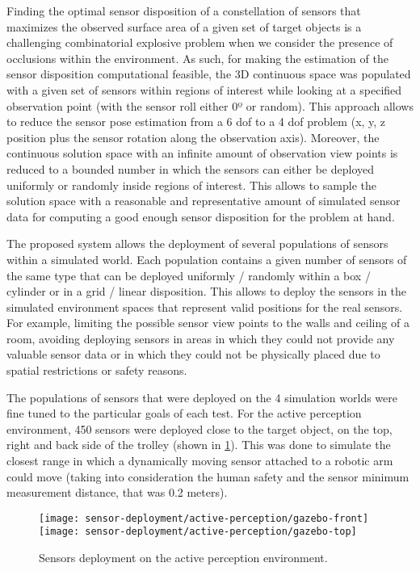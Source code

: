 Finding the optimal sensor disposition of a constellation of sensors that maximizes the observed surface area of a given set of target objects is a challenging combinatorial explosive problem when we consider the presence of occlusions within the environment. As such, for making the estimation of the sensor disposition computational feasible, the 3D continuous space was populated with a given set of sensors within regions of interest while looking at a specified observation point (with the sensor roll either 0º or random). This approach allows to reduce the sensor pose estimation from a 6 \gls{dof} to a 4 \gls{dof} problem (x, y, z position plus the sensor rotation along the observation axis). Moreover, the continuous solution space with an infinite amount of observation view points is reduced to a bounded number in which the sensors can either be deployed uniformly or randomly inside regions of interest. This allows to sample the solution space with a reasonable and representative amount of simulated sensor data for computing a good enough sensor disposition for the problem at hand.

The proposed system allows the deployment of several populations of sensors within a simulated world. Each population contains a given number of sensors of the same type that can be deployed uniformly / randomly within a box / cylinder or in a grid / linear disposition. This allows to deploy the sensors in the simulated environment spaces that represent valid positions for the real sensors. For example, limiting the possible sensor view points to the walls and ceiling of a room, avoiding deploying sensors in areas in which they could not provide any valuable sensor data or in which they could not be physically placed due to spatial restrictions or safety reasons.

The populations of sensors that were deployed on the 4 simulation worlds were fine tuned to the particular goals of each test. For the active perception environment, 450 sensors were deployed close to the target object, on the top, right and back side of the trolley (shown in \cref{fig:sensors-deployment-active-perception-environment}). This was done to simulate the closest range in which a dynamically moving sensor attached to a robotic arm could move (taking into consideration the human safety and the sensor minimum measurement distance, that was 0.2 meters).

\begin{figure}
	\centering
	\texttt{[image: sensor-deployment/active-perception/gazebo-front]}\hspace{1em}
	\texttt{[image: sensor-deployment/active-perception/gazebo-top]}
	\caption{Sensors deployment on the active perception environment.}
	\label{fig:sensors-deployment-active-perception-environment}
\end{figure}

